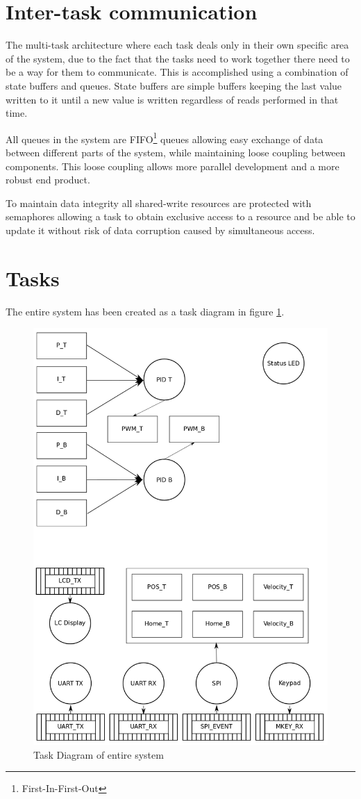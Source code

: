 \documentclass[../../../main]{subfiles}
\begin{document}
\section{Inter-task communication}

The multi-task architecture where each task deals only in their own specific area of the system, due to the fact that the tasks need to work together there need to be a way for them to communicate.
This is accomplished using a combination of state buffers and queues. State buffers are simple buffers keeping the last value written to it until a new value is written regardless of reads performed in that time.

All queues in the system are FIFO\footnote{First-In-First-Out} queues allowing easy exchange of data between different parts of the system, while maintaining loose coupling between components. This loose coupling allows more parallel development and a more robust end product. 

To maintain data integrity all shared-write resources are protected with semaphores allowing a task to obtain exclusive access to a resource and be able to update it without risk of data corruption caused by simultaneous access.

\section{Tasks}

The entire system has been created as a task diagram in figure \ref{fig:entire_task_diagram}. 

\begin{figure}[H]
\includegraphics[width=\columnwidth]{taskdiagram_full.png}
\caption{Task Diagram of entire system}
\label{fig:entire_task_diagram}
\end{figure}
\end{document}
